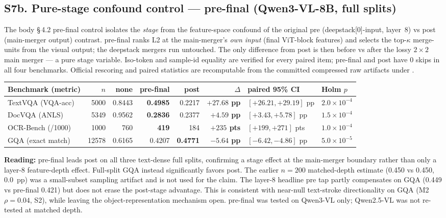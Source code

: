 \clearpage
\begin{table}[!t]
\subsection*{S7b. Pure-stage confound control --- pre-final (Qwen3-VL-8B, full splits)}

The body \S\,4.2 pre-final control isolates the \emph{stage} from the
feature-space confound of the original pre (deepstack[0]-input, layer~8) vs
post (main-merger output) contrast. pre-final ranks L2 at the main-merger's
\emph{own input} (final ViT-block features) and selects the top-$\kappa$
merge-units from the visual output; the deepstack mergers run untouched. The
only difference from post is then before vs after the lossy $2\!\times\!2$ main
merger --- a pure stage variable. Iso-token and sample-id equality are verified
for every paired item; pre-final and post have 0 skips in all four benchmarks.
Official rescoring and paired statistics are recomputable from the committed
compressed raw artifacts under .

\begin{center}
  \scriptsize
  \setlength{\tabcolsep}{2pt}
  \begin{tabular}{@{}l r r r r r l l@{}}
    \toprule
    Benchmark (metric) & $n$ & none & pre-final & post & $\Delta$ & paired 95\% CI & Holm $p$ \\
    \midrule
    TextVQA (VQA-acc) & 5000  & 0.8443 & \textbf{0.4985} & 0.2217 & \textbf{$+27.68$ pp} & $[+26.21,+29.19]$ pp & $2.0\!\times\!10^{-4}$ \\
    DocVQA (ANLS)     & 5349  & 0.9562 & \textbf{0.2836} & 0.2377 & \textbf{$+4.59$ pp}  & $[+3.43,+5.78]$ pp & $1.5\!\times\!10^{-4}$ \\
    OCR-Bench (/1000) & 1000  & 760    & \textbf{419}    & 184    & \textbf{$+235$ pts}  & $[+199,+271]$ pts & $1.0\!\times\!10^{-4}$ \\
    GQA (exact match) & 12578 & 0.6165 & 0.4207 & \textbf{0.4771} & \textbf{$-5.64$ pp} & $[-6.42,-4.86]$ pp & $5.0\!\times\!10^{-5}$ \\
    \bottomrule
  \end{tabular}
\end{center}

\noindent\textbf{Reading:} pre-final leads post on all three text-dense full
splits, confirming a stage effect at the main-merger boundary rather than only
a layer-8 feature-depth effect. Full-split GQA instead significantly favors
post. The earlier $n=200$ matched-depth estimate (0.450 vs 0.450, $0.0$~pp)
was a small-subset sampling artifact and is not used for the claim. The
layer-8 headline pre tap partly compensates on GQA (0.449 vs pre-final 0.421)
but does not erase the post-stage advantage. This is consistent with near-null
text-stroke directionality on GQA (M2 $\rho=0.04$, S2), while leaving the
object-representation mechanism open. pre-final was tested on Qwen3-VL only;
Qwen2.5-VL was not re-tested at matched depth.
\end{table}

